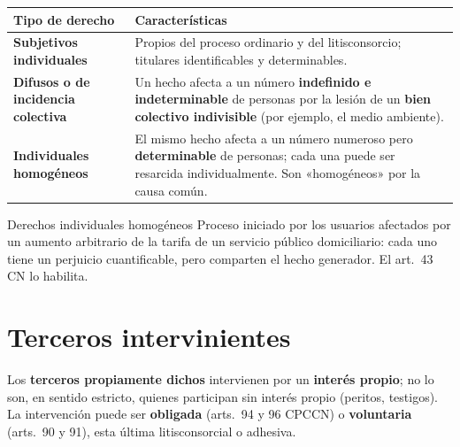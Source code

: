 \documentclass[12pt,oneside]{book}
\renewcommand{\arraystretch}{1.15}
\begin{document}
\begin{table}[H]
\centering
\renewcommand{\arraystretch}{1.25}
\begin{tabularx}{\textwidth}{>{\bfseries\RaggedRight\arraybackslash}p{}>{\RaggedRight\arraybackslash}X}
\toprule
Tipo de derecho & Características \\
\midrule
Subjetivos individuales & Propios del proceso ordinario y del litisconsorcio; titulares identificables y determinables. \\
\addlinespace
Difusos o de incidencia colectiva & Un hecho afecta a un número \textbf{indefinido e indeterminable} de personas por la lesión de un \textbf{bien colectivo indivisible} (por ejemplo, el medio ambiente). \\
\addlinespace
Individuales homogéneos & El mismo hecho afecta a un número numeroso pero \textbf{determinable} de personas; cada una puede ser resarcida individualmente. Son «homogéneos» por la causa común. \\
\bottomrule
\end{tabularx}
\end{table}

\begin{example}{Derechos individuales homogéneos}
Proceso iniciado por los usuarios afectados por un aumento arbitrario de la tarifa de un servicio público domiciliario: cada uno tiene un perjuicio cuantificable, pero comparten el hecho generador. El art.~43 CN lo habilita.
\end{example}

\section{Terceros intervinientes}

Los \textbf{terceros propiamente dichos} intervienen por un \textbf{interés propio}; no lo son, en sentido estricto, quienes participan sin interés propio (peritos, testigos). La intervención puede ser \textbf{obligada} (arts.~94 y 96 CPCCN) o \textbf{voluntaria} (arts.~90 y 91), esta última litisconsorcial o adhesiva.
\end{document}
